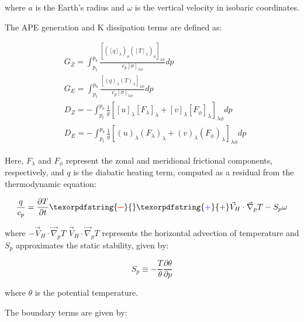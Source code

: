 \documentclass[pdflatex,sn-chicago]{sn-jnl}%
\makeatletter
\theoremstyle{plain}
\theoremstyle{definition}
\theoremstyle{remark}
\theoremstyle{definition}
\providecommand{\DIFaddtex}[1]{{\protect\color{blue}#1}} %
\providecommand{\DIFdeltex}[1]{{\protect\color{red}\sout{#1}}} %
\providecommand{\DIFaddbegin}{} %
\providecommand{\DIFaddend}{} %
\providecommand{\DIFdelbegin}{} %
\providecommand{\DIFdelend}{} %
\providecommand{\DIFadd}[1]{\texorpdfstring{\DIFaddtex{#1}}{#1}} %
\providecommand{\DIFdel}[1]{\texorpdfstring{\DIFdeltex{#1}}{}} %
\let\sout@orig\sout %
\renewcommand{\sout}[1]{\ifmmode\text{\sout@orig{\ensuremath{#1}}}\else\sout@orig{#1}\fi} %
\makeatother
\begin{document}
where $a$ is the Earth's radius and $\omega$ is the vertical velocity in isobaric coordinates. 


The APE generation and K dissipation terms are defined as:

\begin{align}
    &G_Z =  \int_{p_t}^{p_b} \frac{[([q]_\lambda)_\phi ([T]_\lambda)_\phi]_{\lambda \phi}}{c_p[\sigma]_{\lambda \phi}} dp \\
    &G_E =  \int_{p_t}^{p_b} \frac{[(q)_\lambda (T)_\lambda]_{\lambda \phi}}{c_p[\sigma]_{\lambda \phi}} dp \\
    &D_Z = -  \int_{p_t}^{p_b} \frac{1}{g} [[u]_\lambda [F_\lambda]_\lambda + [v]_\lambda [F_\phi]_\lambda]_{\lambda \phi} dp \\
    &D_E = -  \int_{p_t}^{p_b} \frac{1}{g} [(u)_\lambda (F_\lambda)_\lambda + (v)_\lambda (F_\phi)_\lambda]_{\lambda \phi} dp
\end{align}

Here, $F_{\lambda}$ and $F_{\phi}$ represent the zonal and meridional frictional components, respectively, and $q$ is the diabatic heating term, computed as a residual from the thermodynamic equation:

\begin{equation}
    \frac{q}{c_p} = \frac{\partial T}{\partial t} \DIFdelbegin \DIFdel{- }\DIFdelend \DIFaddbegin \DIFadd{+ }\DIFaddend \Vec{V}_H \cdot \Vec{\nabla}_p T - S_p\omega
\end{equation}

where \DIFdelbegin \DIFdel{$-\Vec{V}_H \cdot \Vec{\nabla}_p T$ }\DIFdelend \DIFaddbegin \DIFadd{$\Vec{V}_H \cdot \Vec{\nabla}_p T$ }\DIFaddend represents the horizontal advection of temperature and $S_p$ approximates the static stability, given by:

\begin{equation}
    S_p \equiv -\frac{T}{\theta}\frac{\partial \theta}{\partial p}
\end{equation}

where $\theta$ is the potential temperature. 


The boundary terms are given by:
\end{document}
